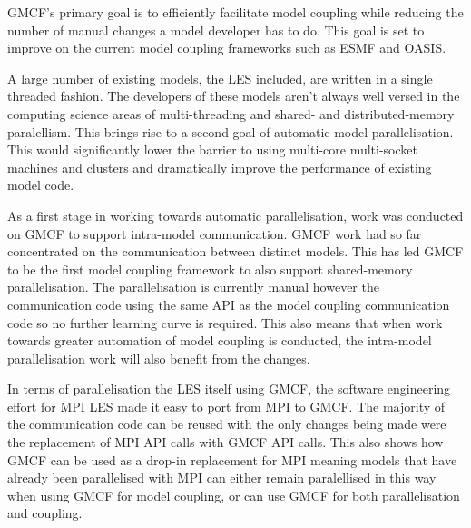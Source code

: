 GMCF's primary goal is to efficiently facilitate model coupling while reducing
the number of manual changes a model developer has to do. This goal is set to
improve on the current model coupling frameworks such as ESMF and OASIS.

A large number of existing models, the LES included, are written in a single
threaded fashion. The developers of these models aren't always well versed in
the computing science areas of multi-threading and shared- and
distributed-memory paralellism. This brings rise to a second goal of automatic
model parallelisation. This would significantly lower the barrier to using
multi-core multi-socket machines and clusters and dramatically improve the
performance of existing model code.

As a first stage in working towards automatic parallelisation, work was
conducted on GMCF to support intra-model communication. GMCF work had so far
concentrated on the communication between distinct models. This has led GMCF to
be the first model coupling framework to also support shared-memory
parallelisation. The parallelisation is currently manual however the
communication code using the same API as the model coupling communication code
so no further learning curve is required. This also means that when work towards
greater automation of model coupling is conducted, the intra-model
parallelisation work will also benefit from the changes.

In terms of parallelisation the LES itself using GMCF, the software engineering
effort for MPI LES made it easy to port from MPI to GMCF. The majority of the
communication code can be reused with the only changes being made were the
replacement of MPI API calls with GMCF API calls. This also shows how GMCF can
be used as a drop-in replacement for MPI meaning models that have already been
parallelised with MPI can either remain paralellised in this way when using GMCF
for model coupling, or can use GMCF for both parallelisation and coupling.
